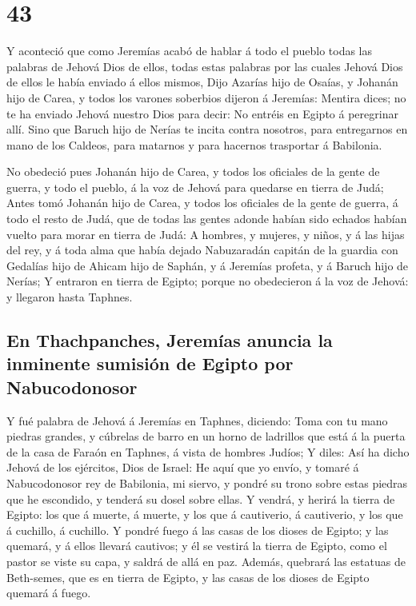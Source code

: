 \hypertarget{section-24-43}{%
\section{43}\label{section-24-43}}

 Y aconteció que como Jeremías acabó de hablar á todo el
pueblo todas las palabras de Jehová Dios de ellos, todas estas palabras
por las cuales Jehová Dios de ellos le había enviado á ellos mismos,
 Dijo Azarías hijo de Osaías, y Johanán hijo de Carea, y
todos los varones soberbios dijeron á Jeremías: Mentira dices; no te ha
enviado Jehová nuestro Dios para decir: No entréis en Egipto á
peregrinar allí.  Sino que Baruch hijo de Nerías te incita
contra nosotros, para entregarnos en mano de los Caldeos, para matarnos
y para hacernos trasportar á Babilonia.

 No obedeció pues Johanán hijo de Carea, y todos los
oficiales de la gente de guerra, y todo el pueblo, á la voz de Jehová
para quedarse en tierra de Judá;  Antes tomó Johanán hijo
de Carea, y todos los oficiales de la gente de guerra, á todo el resto
de Judá, que de todas las gentes adonde habían sido echados habían
vuelto para morar en tierra de Judá:  A hombres, y
mujeres, y niños, y á las hijas del rey, y á toda alma que había dejado
Nabuzaradán capitán de la guardia con Gedalías hijo de Ahicam hijo de
Saphán, y á Jeremías profeta, y á Baruch hijo de Nerías; 
Y entraron en tierra de Egipto; porque no obedecieron á la voz de
Jehová: y llegaron hasta Taphnes.

\hypertarget{en-thachpanches-jeremuxedas-anuncia-la-inminente-sumisiuxf3n-de-egipto-por-nabucodonosor}{%
\subsection{En Thachpanches, Jeremías anuncia la inminente sumisión de
Egipto por
Nabucodonosor}\label{en-thachpanches-jeremuxedas-anuncia-la-inminente-sumisiuxf3n-de-egipto-por-nabucodonosor}}

 Y fué palabra de Jehová á Jeremías en Taphnes, diciendo:
 Toma con tu mano piedras grandes, y cúbrelas de barro en
un horno de ladrillos que está á la puerta de la casa de Faraón en
Taphnes, á vista de hombres Judíos;  Y diles: Así ha
dicho Jehová de los ejércitos, Dios de Israel: He aquí que yo envío, y
tomaré á Nabucodonosor rey de Babilonia, mi siervo, y pondré su trono
sobre estas piedras que he escondido, y tenderá su dosel sobre ellas.
 Y vendrá, y herirá la tierra de Egipto: los que á
muerte, á muerte, y los que á cautiverio, á cautiverio, y los que á
cuchillo, á cuchillo.  Y pondré fuego á las casas de los
dioses de Egipto; y las quemará, y á ellos llevará cautivos; y él se
vestirá la tierra de Egipto, como el pastor se viste su capa, y saldrá
de allá en paz.  Además, quebrará las estatuas de
Beth-semes, que es en tierra de Egipto, y las casas de los dioses de
Egipto quemará á fuego.

